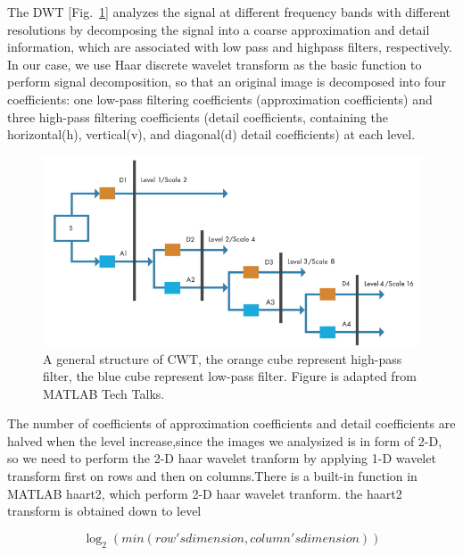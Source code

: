   The DWT [Fig.~\ref{fig:dwt}] analyzes the signal at different frequency bands with different resolutions by decomposing the signal into a coarse approximation and detail information, which are associated with low pass and highpass filters, respectively. In our case, we use Haar discrete wavelet transform as the basic function to perform signal decomposition, so that an original image is decomposed into four coefficients: one low-pass filtering coefficients (approximation coefficients) and three high-pass filtering coefficients (detail coefficients, containing the horizontal(h), vertical(v), and diagonal(d) detail coefficients) at each level.


\begin{figure}[h]
\centering
\includegraphics[width=1\textwidth]{images/dwt.png}
\caption[Structure of CNNs]{A general structure of CWT, the orange cube represent high-pass filter, the blue cube represent low-pass filter. Figure is adapted from MATLAB Tech Talks.}
\label{fig:dwt}
\end{figure}

  The number of coefficients of approximation coefficients and detail coefficients are halved when the level increase,since the images we analysized is in form of 2-D, so we need to perform the 2-D haar wavelet tranform by applying 1-D wavelet transform first on rows and then on columns.There is a built-in function in MATLAB haart2, which perform 2-D haar wavelet tranform.
the haart2 transform is obtained down to level

\begin{equation}
\log_2(min(row's dimension,column's dimension)) \label{equa:log1}
\end{equation}

